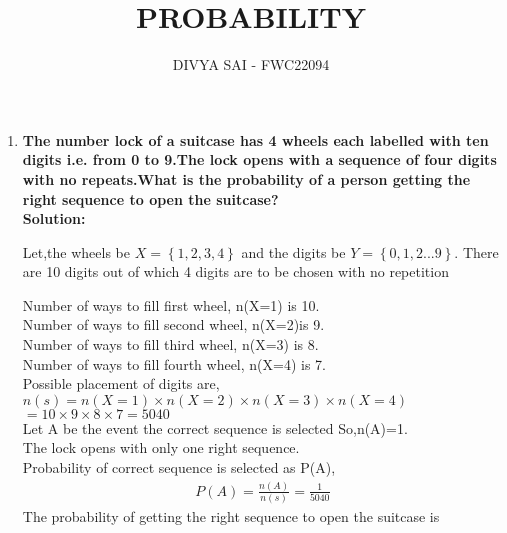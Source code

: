 \documentclass{article}
\providecommand{\cbrak}[1]{\ensuremath{\left\{#1\right\}}}
\newcommand*{\permcomb}[4][0mu]{{{}^{#3}\mkern#1#2_{#4}}}
\newcommand*{\perm}[1][-3mu]{\permcomb[#1]{P}}
\begin{document}
\title{PROBABILITY}
\author{\Large DIVYA SAI - FWC22094}
\date{}

\maketitle
\begin{enumerate}[label=16.\arabic{enumi}.\arabic{enumii}]%
\setcounter{enumi}{3}
\setcounter{enumii}{10}

\item 
\textbf {The number lock of a suitcase has 4 wheels each labelled with ten digits i.e. from 0 to 9.The lock opens with a sequence of four digits with no repeats.What is the probability of a person getting the right sequence to open the suitcase?}\\[1ex]

\textbf{Solution:}

Let,the wheels be $X =\cbrak{1,2,3,4}$ and the digits be $Y=\cbrak{0,1,2...9}$.
There are 10 digits out of which 4 digits are to be chosen with no repetition

\begin{table}[h]
	
\end{table}

\begin{table}[h]
	
\end{table}
Number of ways to fill first wheel, n(X=1) is 10.\\
Number of ways to fill second wheel, n(X=2)is 9.\\
Number of ways to fill third wheel, n(X=3) is 8.\\
Number of ways to fill fourth wheel, n(X=4) is 7.\\

Possible placement of digits are,\\
$n(s)=n(X=1) \times n(X=2) \times n(X=3) \times n(X=4)$
$=10 \times 9 \times 8 \times 7 = 5040 $\\

Let A be the event the correct sequence is selected So,n(A)=1.\\
The lock opens with only one right sequence.\\

Probability of correct sequence is selected as P(A),
\begin{align*}
P(A)=\frac{n(A)}{n(s)}=\frac{1}{5040}
\end{align*}
The probability of getting the right sequence to open the suitcase is 
\end{enumerate}
\end{document}
